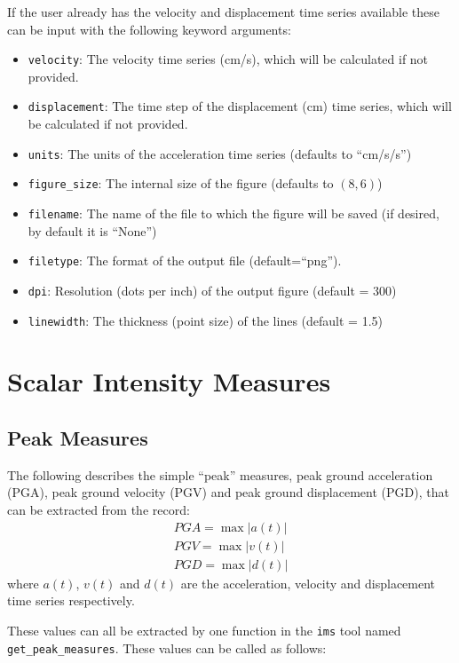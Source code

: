 \noindent If the user already has the velocity and displacement time series available these can be input with the following keyword arguments:

\begin{itemize}
\item \verb=velocity=: The velocity time series (cm/s), which will be calculated if not provided.
\item \verb=displacement=: The time step of the displacement (cm) time series, which will be calculated if not provided.
\item \verb=units=: The units of the acceleration time series (defaults to ``cm/s/s'')
\item \verb=figure_size=: The internal size of the figure (defaults to $(8, 6)$)
\item \verb=filename=: The name of the file to which the figure will be saved (if desired, by default it is ``None'')
\item \verb=filetype=: The format of the output file (default=``png'').
\item \verb=dpi=: Resolution (dots per inch) of the output figure (default = 300)
\item \verb=linewidth=: The thickness (point size) of the lines (default = 1.5)
\end{itemize}


\section{Scalar Intensity Measures}
\label{sec:scalar_ims}

\subsection{Peak Measures}

The following describes the simple ``peak'' measures, peak ground acceleration (PGA), peak ground velocity (PGV) and peak ground displacement (PGD), that can be extracted from the record:
\begin{align}
PGA = \max |a \left( t \right)| \nonumber\\
PGV = \max |v \left( t \right)| \\
PGD = \max |d \left( t \right)| \nonumber
\end{align}
where $a \left( t \right)$, $v \left( t \right)$ and $d \left( t \right)$ are the acceleration, velocity and displacement time series respectively.

These values can all be extracted by one function in the \verb=ims= tool named \verb=get_peak_measures=. These values can be called as follows:

